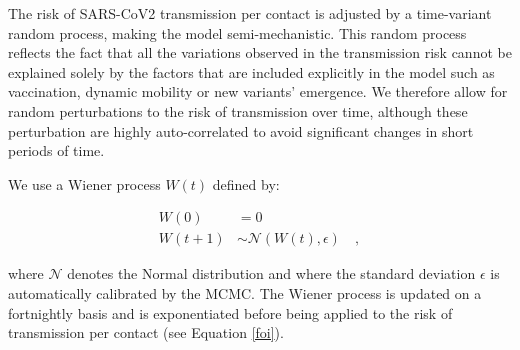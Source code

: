 The risk of SARS-CoV2 transmission per contact is adjusted by a time-variant random process, making
the model semi-mechanistic. This random process reflects the fact that all the variations observed in the transmission
risk cannot be explained solely by the factors that are included explicitly in the model such as vaccination, dynamic mobility or new variants' emergence.
We therefore allow for random perturbations to the risk of transmission over time, although these perturbation are highly auto-correlated
to avoid significant changes in short periods of time.

We use a Wiener process $W(t)$  defined by:

\begin{equation}
    \begin{split}
    W(0) & = 0 \\
    W(t+1) & \sim \mathcal{N}(W(t), \epsilon) \quad ,
    \end{split}
\end{equation}

where $\mathcal{N}$ denotes the Normal distribution and where the standard deviation $\epsilon$ is automatically calibrated by the MCMC.
The Wiener process is updated on a fortnightly basis and is exponentiated before being applied to the risk of transmission per contact (see Equation \ref{foi}).